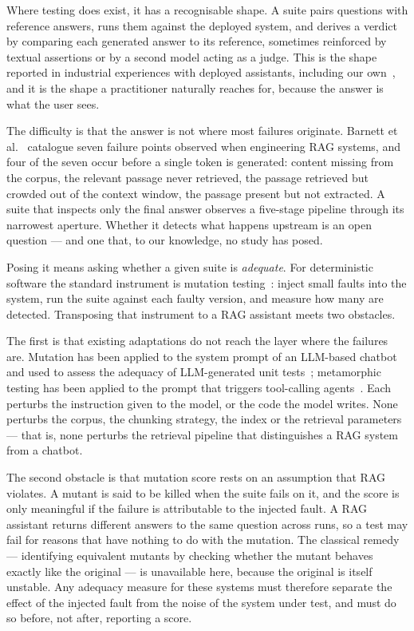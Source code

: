 \documentclass[a4paper,fleqn]{cas-dc}
\begin{document}
Where testing does exist, it has a recognisable shape. A suite pairs questions
with reference answers, runs them against the deployed system, and derives a
verdict by comparing each generated answer to its reference, sometimes
reinforced by textual assertions or by a second model acting as a judge. This is
the shape reported in industrial experiences with deployed assistants, including
our own~\cite{oliveira2026sast}, and it is the shape a practitioner naturally
reaches for, because the answer is what the user sees.

The difficulty is that the answer is not where most failures originate. Barnett
et al.~\cite{barnett2024seven} catalogue seven failure points observed when
engineering RAG systems, and four of the seven occur before a single token is
generated: content missing from the corpus, the relevant passage never
retrieved, the passage retrieved but crowded out of the context window, the
passage present but not extracted. A suite that inspects only the final answer
observes a five-stage pipeline through its narrowest aperture. Whether it
detects what happens upstream is an open question --- and one that, to our
knowledge, no study has posed.

Posing it means asking whether a given suite is \emph{adequate}. For
deterministic software the standard instrument is mutation
testing~\cite{demillo1978hints,jia2011analysis}: inject small faults into the
system, run the suite against each faulty version, and measure how many are
detected. Transposing that instrument to a RAG assistant meets two obstacles.

The first is that existing adaptations do not reach the layer where the failures
are. Mutation has been applied to the system prompt of an LLM-based
chatbot~\cite{braga2026mutation} and used to assess the adequacy of
LLM-generated unit tests~\cite{cabral2026prompt}; metamorphic testing has been
applied to the prompt that triggers tool-calling agents~\cite{amorim2026trigger}.
Each perturbs the instruction given to the model, or the code the model writes.
None perturbs the corpus, the chunking strategy, the index or the retrieval
parameters --- that is, none perturbs the retrieval pipeline that distinguishes
a RAG system from a chatbot.

The second obstacle is that mutation score rests on an assumption that RAG
violates. A mutant is said to be killed when the suite fails on it, and the score
is only meaningful if the failure is attributable to the injected fault. A RAG
assistant returns different answers to the same question across runs, so a test
may fail for reasons that have nothing to do with the mutation. The classical
remedy --- identifying equivalent mutants by checking whether the mutant behaves
exactly like the original --- is unavailable here, because the original is
itself unstable. Any adequacy measure for these systems must therefore separate
the effect of the injected fault from the noise of the system under test, and
must do so before, not after, reporting a score.
\end{document}
